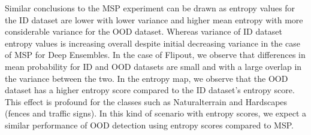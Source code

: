     Similar conclusions to the MSP experiment can be drawn as entropy values for the ID dataset are lower with lower variance and higher mean entropy with more considerable variance for the OOD dataset.
    Whereas variance of ID dataset entropy values is increasing overall despite initial decreasing variance in the case of MSP for Deep Ensembles.
    In the case of Flipout, we observe that differences in mean probability for ID and OOD datasets are small and with a large overlap in the variance between the two.
    In the entropy map, we observe that the OOD dataset has a higher entropy score compared to the ID dataset's entropy score.
    This effect is profound for the classes such as Naturalterrain and Hardscapes (fences and traffic signs).
    In this kind of scenario with entropy scores, we expect a similar performance of OOD detection using entropy scores compared to MSP.
